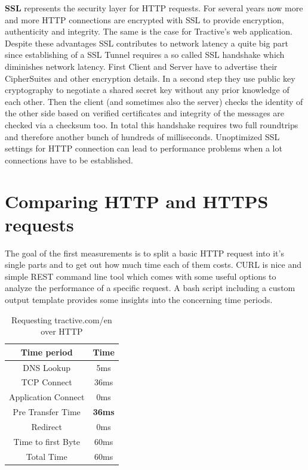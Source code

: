 \textbf{SSL} represents the security layer for HTTP requests. For several years now more and more HTTP connections are encrypted with SSL to provide encryption, authenticity and integrity. The same is the case for Tractive's web application. Despite these advantages SSL contributes to network latency a quite big part since establishing of a SSL Tunnel requires a so called SSL handshake which diminishes network latency. First Client and Server have to advertise their CipherSuites and other encryption details. In a second step they use public key cryptography to negotiate a shared secret key without any prior knowledge of each other. Then the client (and sometimes also the server) checks the identity of the other side based on verified certificates and integrity of the messages are checked via a checksum too. In total this handshake requires two full roundtrips and therefore another bunch of hundreds of milliseconds. Unoptimized SSL settings for HTTP connection can lead to performance problems when a lot connections have to be established.

\section{Comparing HTTP and HTTPS requests}
The goal of the first measurements is to split a basic HTTP request into it's single parts and to get out how much time each of them costs. 
CURL is nice and simple REST command line tool which comes with some useful options to analyze the performance of a specific request. A bash script including a custom output template provides some insights into the concerning time periods. 

\begin{table}[h]
\begin{center}
\begin{tabular}{| c | c |}
    \hline
    Time period & Time  \\ \hline
    DNS Lookup & 5ms  \\ \hline
    TCP Connect & 36ms \\ \hline
    Application Connect & 0ms \\ \hline 
    Pre Transfer Time & \textbf{36ms} \\ \hline
    Redirect & 0ms\\ \hline
    Time to first Byte & 60ms \\ \hline
    Total Time & 60ms \\
    \hline
\end{tabular}
\caption{Requesting tractive.com/en over HTTP}
\end{center}
\end{table}

